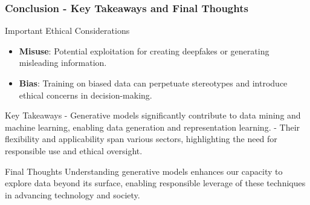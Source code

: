 \documentclass[aspectratio=169]{beamer}
\begin{document}
\begin{frame}[fragile]
  \frametitle{Conclusion - Key Takeaways and Final Thoughts}
  \begin{block}{Important Ethical Considerations}
    \begin{itemize}
      \item \textbf{Misuse}: Potential exploitation for creating deepfakes or generating misleading information.
      \item \textbf{Bias}: Training on biased data can perpetuate stereotypes and introduce ethical concerns in decision-making.
    \end{itemize}
  \end{block}

  \begin{block}{Key Takeaways}
    - Generative models significantly contribute to data mining and machine learning, enabling data generation and representation learning.
    - Their flexibility and applicability span various sectors, highlighting the need for responsible use and ethical oversight.
  \end{block}

  \begin{block}{Final Thoughts}
    Understanding generative models enhances our capacity to explore data beyond its surface, enabling responsible leverage of these techniques in advancing technology and society.
  \end{block}
\end{frame}
\end{document}
